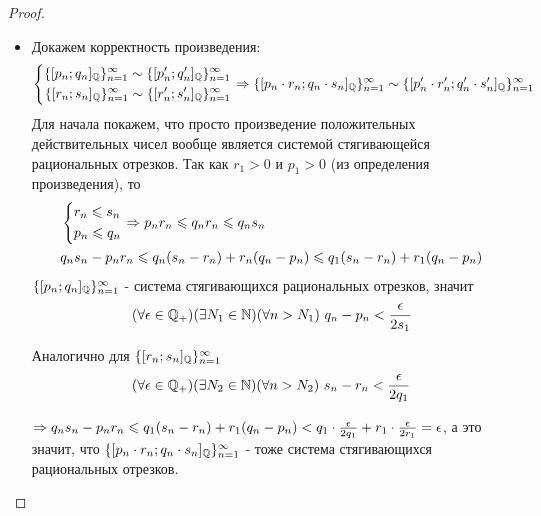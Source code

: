 \begin{proof}~

    \begin{itemize}
        \item Докажем корректность произведения:
            \[
                \left\{\begin{aligned}\{[p_n; q_n]_{\mathbb{Q}}\}_{n = 1}^\infty \sim
                    \{[p'_n; q'_n]_{\mathbb{Q}}\}_{n = 1}^\infty \\ 
                    \{[r_n; s_n]_{\mathbb{Q}}\}_{n = 1}^\infty \sim
                    \{[r'_n; s'_n]_{\mathbb{Q}}\}_{n = 1}^\infty\end{aligned}\right.
                \Rightarrow
                \{[p_n \cdot r_n; q_n \cdot s_n]_{\mathbb{Q}}\}_{n = 1}^\infty
                \sim \{[p'_n \cdot r'_n; q'_n \cdot s'_n]_{\mathbb{Q}}\}_{n = 1}^\infty
            \]
            Для начала покажем, что просто произведение положительных
            действительных чисел вообще является системой
            стягивающейся рациональных отрезков. Так как
            $r_1 > 0$ и $p_1 > 0$ (из определения произведения), то
            \begin{align*}
                &\left\{\begin{aligned}
                &r_n \leqslant s_n \\ 
                &p_n \leqslant q_n
                \end{aligned}\right. 
                \Rightarrow p_n r_n \leqslant q_n r_n \leqslant q_n s_n \\
                &q_n s_n - p_n r_n \leqslant q_n (s_n - r_n) +
                r_n (q_n - p_n) \leqslant q_1 (s_n - r_n) + r_1 (q_n - p_n)
            \end{align*}
            $\{[p_n; q_n]_{\mathbb{Q}}\}_{n = 1}^\infty$ - система
            стягивающихся рациональных отрезков, значит
            \[
            (\forall \epsilon \in \mathbb{Q}_+)(\exists N_1 \in \mathbb{N})
            (\forall n > N_1)\ q_n - p_n < \frac{\epsilon}{2s_1}
            \]
            
            Аналогично для $\{[r_n; s_n]_{\mathbb{Q}}\}_{n = 1}^\infty$
            \[
            (\forall \epsilon \in \mathbb{Q}_+)(\exists N_2 \in \mathbb{N})
            (\forall n > N_2)\ s_n - r_n < \frac{\epsilon}{2q_1}
            \]
            
            $\Rightarrow q_n s_n - p_n r_n \leqslant q_1 (s_n - r_n) +
            r_1 (q_n - p_n) < q_1 \cdot \frac{\epsilon}{2q_1} +
            r_1 \cdot \frac{\epsilon}{2r_1} = \epsilon$, а это значит, что
            $\{[p_n \cdot r_n; q_n \cdot s_n]_{\mathbb{Q}}\}_{n = 1}^\infty$ - тоже система
            стягивающихся рациональных отрезков.
            

\end{itemize}
\end{proof}
